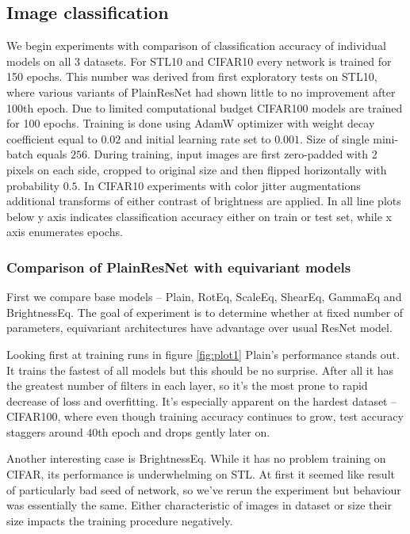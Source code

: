 \newpage










\subsection{Image classification}
    \label{sec:img_cl}
    We begin experiments with comparison of classification accuracy of
    individual models on all 3 datasets. For STL10 and CIFAR10 every network
    is trained for 150 epochs. This number was derived from first exploratory
    tests on STL10, where various variants of PlainResNet had shown little to
    no improvement after 100th epoch. Due to limited computational budget
    CIFAR100 models are trained for 100 epochs. Training is done using AdamW
    optimizer \cite{adamw} with weight decay coefficient equal to $0.02$ and
    initial learning rate set to $0.001$. Size of single mini-batch equals
    $256$. During training, input images are first zero-padded with 2 pixels
    on each side, cropped to original size and then flipped horizontally with
    probability $0.5$. In CIFAR10 experiments with color jitter augmentations
    additional transforms of either contrast of brightness are applied.
    In all line plots below y axis indicates classification accuracy either on
    train or test set, while x axis enumerates epochs.

    \subsubsection*{Comparison of PlainResNet with equivariant models}
    First we compare base models -- Plain, RotEq, ScaleEq, ShearEq, GammaEq and
    BrightnessEq. The goal of experiment is to determine whether at fixed number
    of parameters, equivariant
    architectures have advantage over usual ResNet model.

    Looking first at
    training runs in figure \ref{fig:plot1} Plain's performance stands out.
    It trains the fastest of all models but this should be no surprise. After
    all it has the greatest number of filters in each layer, so it's the most
    prone to rapid decrease of loss and overfitting. It's especially apparent on
    the hardest dataset --
    CIFAR100, where even though training accuracy continues to grow, test
    accuracy staggers around $40$th epoch and drops gently later on.

    Another interesting case is BrightnessEq. While it has no problem training
    on CIFAR, its performance is underwhelming on STL. At first it seemed like
    result of particularly bad seed of network, so we've rerun the experiment
    but behaviour was essentially the same. Either characteristic of images in
    dataset or size their size impacts the training procedure negatively.

